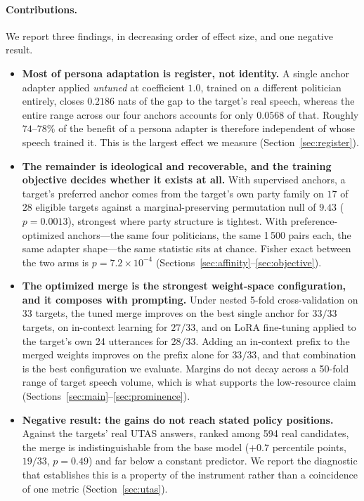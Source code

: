 \documentclass[11pt,letterpaper]{article}
\begin{document}
\paragraph{Contributions.} We report three findings, in decreasing order of effect size, and one negative result.

\begin{itemize}
    \item \textbf{Most of persona adaptation is register, not identity.} A single anchor adapter applied \emph{untuned} at coefficient $1.0$, trained on a different politician entirely, closes $0.2186$ nats of the gap to the target's real speech, whereas the entire range across our four anchors accounts for only $0.0568$ of that. Roughly $74$--$78\%$ of the benefit of a persona adapter is therefore independent of whose speech trained it. This is the largest effect we measure (Section~\ref{sec:register}).
    \item \textbf{The remainder is ideological and recoverable, and the training objective decides whether it exists at all.} With supervised anchors, a target's preferred anchor comes from the target's own party family on $17$ of $28$ eligible targets against a marginal-preserving permutation null of $9.43$ ($p=0.0013$), strongest where party structure is tightest. With preference-optimized anchors---the same four politicians, the same 1\,500 pairs each, the same adapter shape---the same statistic sits at chance. Fisher exact between the two arms is $p=7.2\times10^{-4}$ (Sections~\ref{sec:affinity}--\ref{sec:objective}).
    \item \textbf{The optimized merge is the strongest weight-space configuration, and it composes with prompting.} Under nested 5-fold cross-validation on 33 targets, the tuned merge improves on the best single anchor for $33/33$ targets, on in-context learning for $27/33$, and on LoRA fine-tuning applied to the target's own 24 utterances for $28/33$. Adding an in-context prefix to the merged weights improves on the prefix alone for $33/33$, and that combination is the best configuration we evaluate. Margins do not decay across a 50-fold range of target speech volume, which is what supports the low-resource claim (Sections~\ref{sec:main}--\ref{sec:prominence}).
    \item \textbf{Negative result: the gains do not reach stated policy positions.} Against the targets' real UTAS answers, ranked among 594 real candidates, the merge is indistinguishable from the base model ($+0.7$ percentile points, $19/33$, $p=0.49$) and far below a constant predictor. We report the diagnostic that establishes this is a property of the instrument rather than a coincidence of one metric (Section~\ref{sec:utas}).
\end{itemize}
\end{document}
